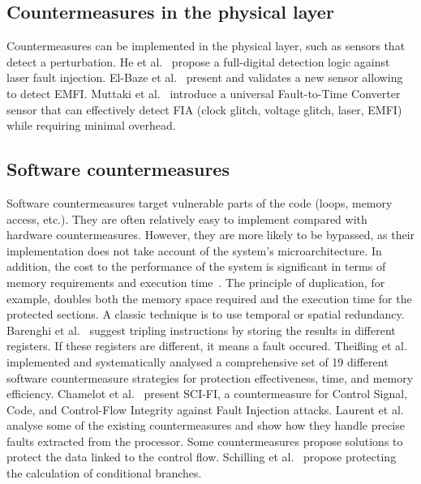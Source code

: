 \subsection{Countermeasures in the physical layer}
Countermeasures can be implemented in the physical layer, such as sensors that detect a perturbation. He et al.~\cite{HBB-16-space} propose a full-digital detection logic against laser fault injection. El-Baze et al.~\cite{ERM-16-date} present and validates a new sensor allowing to detect EMFI. Muttaki et al.~\cite{MZTF-22-host} introduce a universal Fault-to-Time Converter sensor that can effectively detect FIA (clock glitch, voltage glitch, laser, EMFI) while requiring minimal overhead.

\subsection{Software countermeasures}
Software countermeasures target vulnerable parts of the code (loops, memory access, etc.). They are often relatively easy to implement compared with hardware countermeasures. However, they are more likely to be bypassed, as their implementation does not take account of the system's microarchitecture.
In addition, the cost to the performance of the system is significant in terms of memory requirements and execution time~\cite{BCNTW-06-procieee}. The principle of duplication, for example, doubles both the memory space required and the execution time for the protected sections.
A classic technique is to use temporal or spatial redundancy. Barenghi et al.~\cite{BBKPR-10-wess} suggest tripling instructions by storing the results in different registers. If these registers are different, it means a fault occured.
Theißing et al.~\cite{TMSSS-13-date} implemented and systematically analysed a comprehensive set of 19 different software countermeasure strategies for protection effectiveness, time, and memory efficiency.
Chamelot et al.~\cite{CCH-22-date} present SCI-FI, a countermeasure for Control Signal, Code, and Control-Flow Integrity against Fault Injection attacks.
Laurent et al.~\cite{LBDPP-19-microproc} analyse some of the existing countermeasures and show how they handle precise faults extracted from the processor.
Some countermeasures propose solutions to protect the data linked to the control flow. Schilling et al.~\cite{SWM-18-date} propose protecting the calculation of conditional branches.

